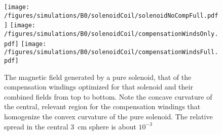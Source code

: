             \begin{figure}
                \texttt{[image: /figures/simulations/B0/solenoidCoil/solenoidNoCompFull.pdf]}
                \texttt{[image: /figures/simulations/B0/solenoidCoil/compensationWindsOnly.pdf]}
                \texttt{[image: /figures/simulations/B0/solenoidCoil/compensationWindsFull.pdf]}
                \caption[Solenoid and compensation field]{The magnetic field generated by a pure solenoid, that of the compensation windings optimized for that solenoid and their combined fields from top to bottom. Note the concave curvature of the central, relevant region for the compensation windings that homogenize the convex curvature of the pure solenoid. The relative spread in the central \SI{3}{\cm} sphere is about $10^{-3}$ }
                \label{fig:results:solenoidField}
            \end{figure}
